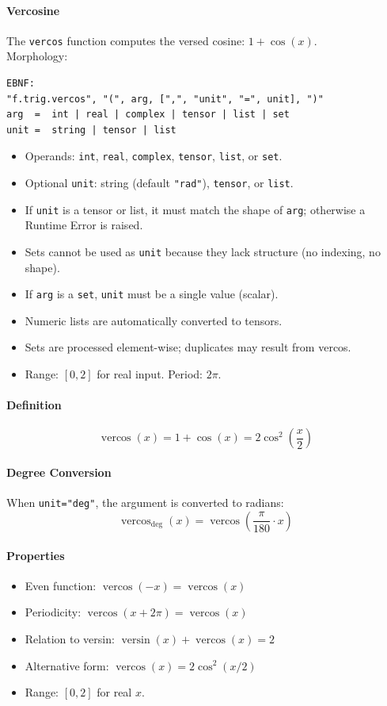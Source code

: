 \paragraph{Vercosine}
The \texttt{vercos} function computes the versed cosine: $1 + \cos(x)$.\\
Morphology:
\begin{verbatim}
EBNF:
"f.trig.vercos", "(", arg, [",", "unit", "=", unit], ")"
arg  =  int | real | complex | tensor | list | set
unit =  string | tensor | list
\end{verbatim}
\begin{itemize}
\item Operands: \texttt{int}, \texttt{real}, \texttt{complex}, \texttt{tensor}, \texttt{list}, or \texttt{set}.
\item Optional \texttt{unit}: string (default \texttt{"rad"}), \texttt{tensor}, or \texttt{list}.
\item If \texttt{unit} is a tensor or list, it must match the shape of \texttt{arg}; otherwise a Runtime Error is raised.
\item Sets cannot be used as \texttt{unit} because they lack structure (no indexing, no shape).
\item If \texttt{arg} is a \texttt{set}, \texttt{unit} must be a single value (scalar).
\item Numeric lists are automatically converted to tensors.
\item Sets are processed element-wise; duplicates may result from vercos.
\item Range: $[0, 2]$ for real input. Period: $2\pi$.
\end{itemize}

\paragraph{Definition}
\[
\operatorname{vercos}(x) = 1 + \cos(x) = 2\cos^2\left(\frac{x}{2}\right)
\]

\paragraph{Degree Conversion}
When \texttt{unit="deg"}, the argument is converted to radians:
\[
\operatorname{vercos}_{\text{deg}}(x) = \operatorname{vercos}\left(\frac{\pi}{180} \cdot x\right)
\]

\paragraph{Properties}
\begin{itemize}
\item Even function: $\operatorname{vercos}(-x) = \operatorname{vercos}(x)$
\item Periodicity: $\operatorname{vercos}(x + 2\pi) = \operatorname{vercos}(x)$
\item Relation to versin: $\operatorname{versin}(x) + \operatorname{vercos}(x) = 2$
\item Alternative form: $\operatorname{vercos}(x) = 2\cos^2(x/2)$
\item Range: $[0, 2]$ for real $x$.
\end{itemize}

